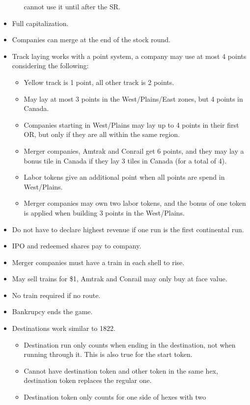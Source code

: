 \documentclass[a4paper,twocolumn]{article}
\begin{document}
\begin{itemize}
\begin{itemize}
		cannot use it until after the SR.
	\end{itemize}
	\item Full capitalization.
	\item Companies can merge at the end of the stock round.
	\item Track laying works with a point system, a company may use at most 4 
	points considering the following:
	\begin{itemize}
		\item Yellow track is 1 point, all other track is 2 points.
		\item May lay at most 3 points in the West/Plains/East zones, but 4 
		points in Canada.
		\item Companies starting in West/Plains may lay up to 4 points in their 
		first OR, but only if they are all within the same region.
		\item Merger companies, Amtrak and Conrail get 6 points, and they may 
		lay a bonus tile in Canada if they lay 3 tiles in Canada (for a total 
		of 4).
		\item Labor tokens give an additional point when all points are spend 
		in West/Plains.
		\item Merger companies may own two labor tokens, and the bonus of one 
		token is applied when building 3 points in the West/Plains.
	\end{itemize}
	\item Do not have to declare highest revenue if one run is the first
	continental run.
	\item IPO and redeemed shares pay to company.
	\item Merger companies must have a train in each shell to rise.
	\item May sell trains for \$1, Amtrak and Conrail may only buy at face 
	value.
	\item No train required if no route.
	\item Bankrupcy ends the game.
	\item Destinations work similar to 1822.
	\begin{itemize}
		\item Destination run only counts when ending in the destination, not
		when running through it. This is also true for the start token.
		\item Cannot have destination token and other token in the same hex,
		destination token replaces the regular one.
		\item Destination token only counts for one side of hexes with two

\end{itemize}
\end{itemize}
\end{document}
